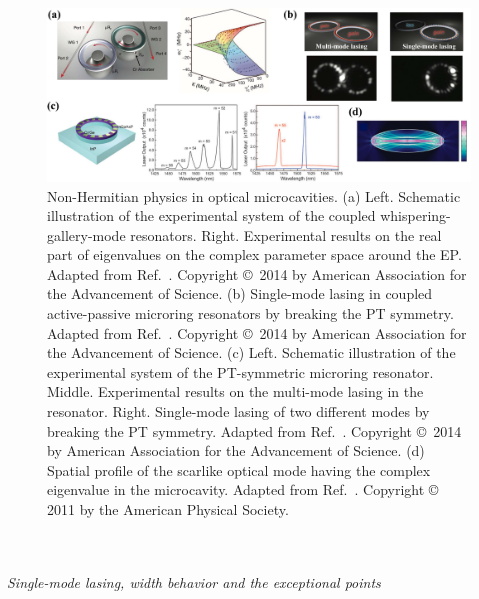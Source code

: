 \documentclass{tADP2e}
\theoremstyle{plain}
\theoremstyle{plain}
\theoremstyle{definition}
\begin{document}
\begin{figure}
\begin{center}
\includegraphics[width=14.8cm]{./Figures/fig_3_opt_cavity.pdf}
\end{center}
\caption{
Non-Hermitian physics in optical microcavities. 
(a) Left. Schematic illustration of the experimental system of the coupled whispering-gallery-mode resonators. Right. Experimental results on the real part of  eigenvalues on the complex parameter space around the EP.
Adapted from Ref.~\cite{PB14}. Copyright \copyright\, 2014 by American Association for the Advancement of Science. 
 (b) Single-mode lasing in coupled active-passive microring resonators by breaking the PT symmetry.  Adapted from Ref.~\cite{HH14}. Copyright \copyright\, 2014 by American Association for the Advancement of Science. 
 (c) Left. Schematic illustration of the experimental system of the PT-symmetric microring resonator. Middle. Experimental results on the multi-mode lasing in the resonator. Right. Single-mode lasing of two different modes by breaking the PT symmetry. 
 Adapted from Ref.~\cite{LF14}. Copyright \copyright\, 2014 by American Association for the Advancement of Science. 
 (d) Spatial profile of the scarlike optical mode having the complex eigenvalue in the microcavity. Adapted from Ref.~\cite{YCH11}. Copyright \copyright\,   2011 by the American Physical Society.
}\label{fig:3optcavity}
\end{figure}
\\ \\ {\it Single-mode lasing, width behavior and the exceptional points}
\end{document}
